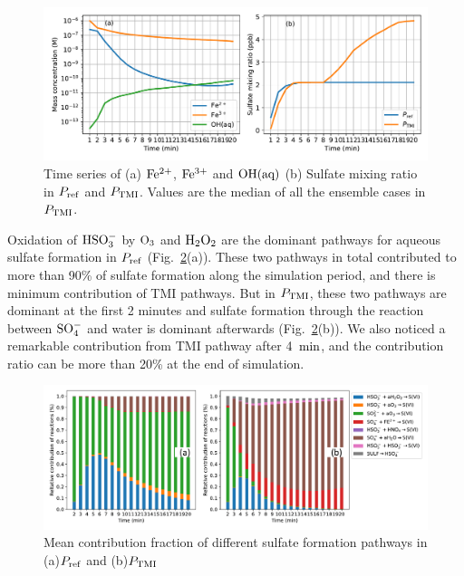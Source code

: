 \documentclass[edeposit,fullpage]{uiucthesis2009}
\makeatletter
\DeclareRobustCommand*\unit[1]
 {\ensuremath{%
   {\thinmuskip3mu\relax
    \def\mu{\text{\textmu}}\def~{\,}%
    \ifx\f@series\testbx\mathbf{#1}\else\mathrm{#1}\fi}}}
\makeatother
\begin{document}
\begin{figure}[ht]
    \centering \includegraphics[scale=0.7]{chap2_figs/chap2_with_tmi_fixOH_mass.pdf}
    \caption{Time series of (a) $\rm Fe^{2+}$, $\rm Fe^{3+}$ and $\rm OH(aq)$ (b) Sulfate mixing ratio in $P_{\rm ref}$ and $P_{\rm TMI}$. Values are the median of all the ensemble cases in $P_{\rm TMI}$. }
    \label{chap2:iron-conc}
\end{figure}

Oxidation of $\rm HSO_3^-$ by $\rm O_3$ and $\rm H_2O_2$ are the dominant pathways for aqueous sulfate formation in $P_{\rm ref}$ (Fig.~\ref{chap2:iron-contri}(a)). These two pathways in total contributed to more than 90\% of sulfate formation along the simulation period, and there is minimum contribution of TMI pathways. But in $P_{\rm TMI}$, these two pathways are dominant at the first 2 minutes and sulfate formation through the reaction between $\rm SO_4^-$ and water is dominant afterwards (Fig.~\ref{chap2:iron-contri}(b)). We also noticed a remarkable contribution from TMI pathway after 4~\unit{min}, and the contribution ratio can be more than 20\% at the end of simulation. 

\begin{figure}[ht]
    \centering \includegraphics[scale=0.7]{chap2_figs/chap2-TMI_contri_factors.pdf}
    \caption{Mean contribution fraction of different sulfate formation pathways in (a)$P_{\rm ref}$ and (b)$P_{\rm TMI}$}
    \label{chap2:iron-contri}
\end{figure}
\end{document}
